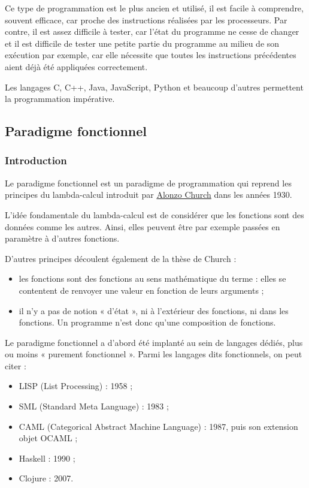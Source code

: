 \documentclass[
  letterpaper,
  DIV=11,
  numbers=noendperiod]{scrartcl}
\providecommand{\tightlist}{%
  \setlength{\itemsep}{0pt}\setlength{\parskip}{0pt}}\usepackage{longtable,booktabs,array}
\begin{document}
Ce type de programmation est le plus ancien et utilisé, il est facile à
comprendre, souvent efficace, car proche des instructions réalisées par
les processeurs. Par contre, il est assez difficile à tester, car l'état
du programme ne cesse de changer et il est difficile de tester une
petite partie du programme au milieu de son exécution par exemple, car
elle nécessite que toutes les instructions précédentes aient déjà été
appliquées correctement.

Les langages C, C++, Java, JavaScript, Python et beaucoup d'autres
permettent la programmation impérative.

\hypertarget{paradigme-fonctionnel}{%
\subsection{Paradigme fonctionnel}\label{paradigme-fonctionnel}}

\hypertarget{introduction}{%
\subsubsection{Introduction}\label{introduction}}

Le paradigme fonctionnel est un paradigme de programmation qui reprend
les principes du lambda-calcul introduit par
\href{https://fr.wikipedia.org/wiki/Alonzo_Church}{Alonzo Church} dans
les années 1930.

L'idée fondamentale du lambda-calcul est de considérer que les fonctions
sont des données comme les autres. Ainsi, elles peuvent être par exemple
passées en paramètre à d'autres fonctions.

D'autres principes découlent également de la thèse de Church :

\begin{itemize}
\tightlist
\item
  les fonctions sont des fonctions au sens mathématique du terme : elles
  se contentent de renvoyer une valeur en fonction de leurs arguments ;
\item
  il n'y a pas de notion « d'état », ni à l'extérieur des fonctions, ni
  dans les fonctions. Un programme n'est donc qu'une composition de
  fonctions.
\end{itemize}

Le paradigme fonctionnel a d'abord été implanté au sein de langages
dédiés, plus ou moins « purement fonctionnel ». Parmi les langages dits
fonctionnels, on peut citer :

\begin{itemize}
\tightlist
\item
  LISP (List Processing) : 1958 ;
\item
  SML (Standard Meta Language) : 1983 ;
\item
  CAML (Categorical Abstract Machine Language) : 1987, puis son
  extension objet OCAML ;
\item
  Haskell : 1990 ;
\item
  Clojure : 2007.
\end{itemize}
\end{document}
